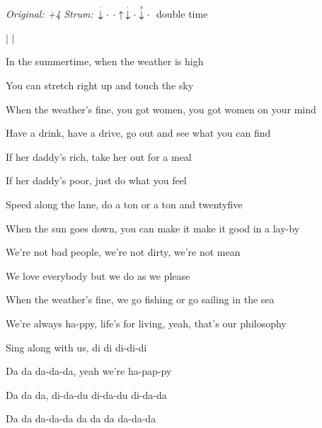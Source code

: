 \begin{song}


\begin{headerbox}
\RaiseBoxWithChucks
\textit{Original: +4} \quad
\textit{Strum:} $\StaccatoDown\Miss\Miss\Up\StaccatoDown\Miss\ChuckDown\Miss$ double time
\end{headerbox}

\begin{hchordbox}
\end{hchordbox}

\large

\bigskip

\Intro {}  |   |   

\bigskip

In the summertime, when the weather is high \par
You can stretch right up and touch the sky \par
When the weather's fine, you got women, you got women on your mind \par
Have a drink, have a drive, go out and see what you can find \par

\bigskip

If her daddy's rich, take her out for a meal \par
If her daddy's poor, just do what you feel \par
Speed along the lane, do a ton or a ton and twentyfive \par
When the sun goes down, you can make it make it good in a lay-by \par

\bigskip

We're not bad people, we're not dirty, we're not mean \par
We love everybody but we do as we please \par
When the weather's fine, we go fishing or go sailing in the sea \par
We're always ha-ppy, life's for living, yeah, that's our philosophy \par

\bigskip

Sing along with us, di di di-di-di \par
Da da da-da-da, yeah we’re ha-pap-py \par
{}Da da da, di-da-du di-da-du di-da-da \par
Da da da-da-da da da da da-da-da \par


\end{song}
